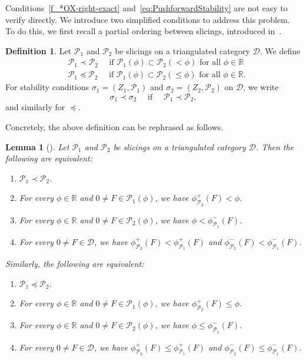 \documentclass[11pt, reqno]{amsart}
\numberwithin{equation}{section}
\theoremstyle{plain}
\newtheorem{lemma}[theorem]{Lemma}
\theoremstyle{remark}
\theoremstyle{definition}
\newtheorem{definition}[theorem]{Definition}
\theoremstyle{italicsname}
\newcommand{\cD}{\mathscr{D}}
\newcommand{\cP}{\mathscr{P}}
\def\RR{\ensuremath{\mathbb{R}}}
\begin{document}
Conditions~\eqref{f_*OX-right-exact} and~\eqref{eq:PushforwardStability} are not easy to verify directly.
We introduce two simplified conditions to address this problem.
To do this, we first recall a partial ordering between slicings, introduced in~\cite{Li:sb}.

\begin{definition}\label{def:Orderslicings}
Let $\cP_1$ and $\cP_2$ be slicings on a triangulated category $\cD$. We define
\begin{align*}
&\cP_1\prec\cP_2\quad\text{ if }\cP_1(\phi)\subset\cP_2(<\phi)\text{ for all }\phi\in\RR\\
&\cP_1\preceq\cP_2\quad\text{ if }\cP_1(\phi)\subset\cP_2(\leq\phi) \text{ for all }\phi\in\RR.
\end{align*}
For stability conditions $\sigma_1=(Z_1,\cP_1)$ and $\sigma_2=(Z_2,\cP_2)$ on $\cD$, we write
\[
\sigma_1\prec \sigma_2 \quad\text{ if } \quad 
\cP_1\prec \cP_2, 
\]
and similarly for $\preceq$.
\end{definition}

Concretely, the above definition can be rephrased as follows. 

\begin{lemma}[{\cite[Lemma~4.11]{Li:sb}}]
\label{lemma-preceq-concrete} 
    Let $\cP_1$ and $\cP_2$ be slicings on a triangulated category $\cD$. 
    Then the following are equivalent: 
    \begin{enumerate}[{\rm (1)}]
        \item $\cP_1 \prec \cP_2$. 
        \item For every $\phi \in \RR$ and $0 \neq F \in \cP_1(\phi)$, we have 
        $\phi^+_{\cP_2}(F) < \phi$. 
        \item For every $\phi \in \RR$ and $0 \neq F \in \cP_2(\phi)$, we have $\phi < \phi^-_{\cP_1}(F)$. 
        \item For every $0 \neq F \in \cD$, we have $\phi^+_{\cP_2}(F) < \phi^+_{\cP_1}(F)$ and $\phi^-_{\cP_2}(F) < \phi^-_{\cP_1}(F)$. 
    \end{enumerate}
    Similarly, the following are equivalent: 
    \begin{enumerate}[{\rm (1)}]
        \item $\cP_1 \preceq \cP_2$. 
        \item For every $\phi \in \RR$ and $0 \neq F \in \cP_1(\phi)$, we have 
        $\phi^+_{\cP_2}(F) \leq \phi$. 
        \item For every $\phi \in \RR$ and $0 \neq F \in \cP_2(\phi)$, we have $\phi \leq \phi^-_{\cP_1}(F)$. 
        \item For every $0 \neq F \in \cD$, we have $\phi^+_{\cP_2}(F) \leq  \phi^+_{\cP_1}(F)$ and $\phi^-_{\cP_2}(F) \leq \phi^-_{\cP_1}(F)$. 
    \end{enumerate}
\end{lemma}
\end{document}
